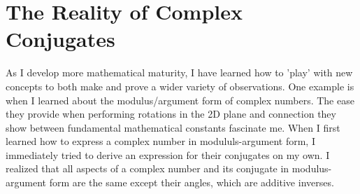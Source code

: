 \section{The Reality of Complex Conjugates}
As I develop more mathematical maturity, I have learned how to 'play' with new concepts to both make and prove a wider variety of observations. One example is when I learned about the modulus/argument form of complex numbers. The ease they provide when performing rotations in the 2D plane and connection they show between fundamental mathematical constants fascinate me.
When I first learned how to express a complex number in modululs-argument form, I immediately tried to derive an expression for their conjugates on my own. I realized that all aspects of a complex number and its conjugate in modulus-argument form are the same except their angles, which are additive inverses. 